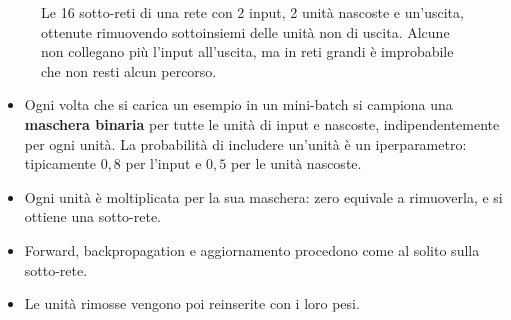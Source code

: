 \begin{figure}[ht]
\centering
{}
\caption{Le 16 sotto-reti di una rete con 2 input, 2 unità nascoste e un'uscita, ottenute rimuovendo sottoinsiemi
delle unità non di uscita. Alcune non collegano più l'input all'uscita, ma in reti grandi è improbabile che non
resti alcun percorso.}
\label{fig:dropout}
\end{figure}

\begin{algoritmo}[Dropout]
\begin{itemize}
  \item Ogni volta che si carica un esempio in un mini-batch si campiona una \textbf{maschera binaria} per tutte le
        unità di input e nascoste, indipendentemente per ogni unità. La probabilità di includere un'unità è un
        iperparametro: tipicamente $0{,}8$ per l'input e $0{,}5$ per le unità nascoste.
  \item Ogni unità è moltiplicata per la sua maschera: zero equivale a rimuoverla, e si ottiene una sotto-rete.
  \item Forward, backpropagation e aggiornamento procedono come al solito sulla sotto-rete.
  \item Le unità rimosse vengono poi reinserite con i loro pesi.
\end{itemize}
\end{algoritmo}

